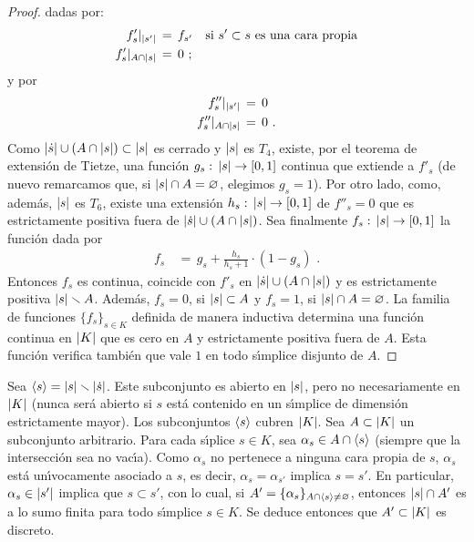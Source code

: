 \begin{proof}
	dadas por:
	\begin{align*}
		f'_{s}|_{\left|s'\right|} & \,=\,f_{s'}
			\quad\text{si } s'\subset s
			\text{ es una cara propia} \\
		f'_{s}|_{A\cap\left|s\right|} & \,=\, 0 \text{ ;}
	\end{align*}
	y por
	\begin{align*}
		f''_{s}|_{\left|s'\right|} & \,=\,0 \\
		f''_{s}|_{A\cap\left|s\right|} & \,=\,0 \text{ .}
	\end{align*}
	Como $\left|\dot{s}\right|\cup(A\cap\left|s\right|)\subset\left|s\right|$ es cerrado
	y $\left|s\right|$ es $T_{4}$, existe, por el teorema de extensi\'{o}n
	de Tietze, una funci\'{o}n $g_{s}:\,\left|s\right|\rightarrow [0,1]$
	continua que extiende a $f'_{s}$ (de nuevo remarcamos que, si
	$\left|s\right|\cap A=\varnothing$, elegimos $g_{s}=1$). Por otro lado,
	como, adem\'{a}s, $\left|s\right|$ es $T_{6}$, existe una extensi\'{o}n
	$h_{s}:\,\left|s\right|\rightarrow [0,1]$ de $f''_{s}=0$ que es
	estrictamente positiva fuera de $\left|\dot{s}\right|\cup(A\cap\left|s\right|)$.
	Sea finalmente $f_{s}:\,\left|s\right|\rightarrow [0,1]$ la funci\'{o}n
	dada por
	\begin{align*}
		f_{s} & \,=\,g_{s} + \frac{h_{s}}{h_{s}+1}\cdot(1-g_{s})
		\text{ .}
	\end{align*}
	Entonces $f_{s}$ es continua, coincide con $f'_{s}$ en
	$\left|\dot{s}\right|\cup(A\cap\left|s\right|)$ y es estrictamente positiva
	$\left|s\right|\smallsetminus A$. Adem\'{a}s, $f_{s}=0$, si $\left|s\right|\subset A$ y
	$f_{s}=1$, si $\left|s\right|\cap A=\varnothing$. La familia de funciones
	$\{f_{s}\}_{s\in K}$ definida de manera inductiva determina una
	funci\'{o}n continua en $\left|K\right|$ que es cero en $A$ y estrictamente
	positiva fuera de $A$. Esta funci\'{o}n verifica tambi\'{e}n que
	vale $1$ en todo s\'{\i}mplice disjunto de $A$.
\end{proof}

Sea $\langle s\rangle=\left|s\right|\smallsetminus\left|\dot{s}\right|$. Este subconjunto
es abierto en $\left|s\right|$, pero no necesariamente en $\left|K\right|$ (nunca ser\'{a}
abierto si $s$ est\'{a} contenido en un s\'{\i}mplice de dimensi\'{o}n
estrictamente mayor). Los subconjuntos $\langle s\rangle$ cubren $\left|K\right|$.
Sea $A\subset\left|K\right|$ un subconjunto arbitrario. Para cada s\'{\i}plice
$s\in K$, sea $\alpha_{s}\in A\cap\langle s\rangle$ (siempre que la
intersecci\'{o}n sea no vac\'{\i}a). Como $\alpha_{s}$ no pertenece a ninguna
cara propia de $s$,
$\alpha_{s}$ est\'{a}
un\'{\i}vocamente asociado a $s$, es decir, $\alpha_{s}=\alpha_{s'}$ implica
$s=s'$. En particular, $\alpha_{s}\in \left|s'\right|$ implica que $s\subset s'$,
con lo cual, si $A'=\{\alpha_{s}\}_{A\cap\langle s\rangle\not=\varnothing}$,
entonces $\left|s\right|\cap A'$ es a lo sumo finita para todo s\'{\i}mplice
$s\in K$. Se deduce entonces que $A'\subset\left|K\right|$ es discreto.

